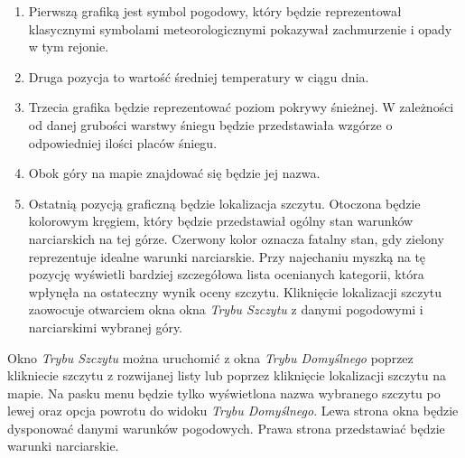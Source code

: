 \documentclass[10pt, a4paper]{article}
\begin{document}
	\begin{enumerate}
\item Pierwszą grafiką jest symbol pogodowy, który będzie reprezentował klasycznymi symbolami meteorologicznymi pokazywał zachmurzenie i opady w tym rejonie. \\
\item Druga pozycja to wartość średniej temperatury w ciągu dnia. \\
\item Trzecia grafika będzie reprezentować poziom pokrywy śnieżnej. W zależności od danej grubości warstwy śniegu będzie przedstawiała wzgórze o odpowiedniej ilości placów śniegu. \\
\item Obok góry na mapie znajdować się będzie jej nazwa. \\
\item Ostatnią pozycją graficzną będzie lokalizacja szczytu. Otoczona będzie kolorowym kręgiem, który będzie przedstawiał ogólny stan warunków narciarskich na tej górze. Czerwony kolor oznacza fatalny stan, gdy zielony reprezentuje idealne warunki narciarskie. Przy najechaniu myszką na tę pozycję wyświetli bardziej szczegółowa lista ocenianych kategorii, która wpłynęła na ostateczny wynik oceny szczytu. Kliknięcie lokalizacji szczytu zaowocuje otwarciem okna okna \textit{Trybu Szczytu} z danymi pogodowymi i narciarskimi wybranej góry.\\
\end{enumerate}
\begin{flushleft}
	Okno \textit{Trybu Szczytu} można uruchomić z okna \textit{Trybu Domyślnego} poprzez klikniecie szczytu z rozwijanej listy lub poprzez kliknięcie lokalizacji szczytu na mapie. Na pasku menu będzie tylko wyświetlona nazwa wybranego szczytu po lewej oraz opcja powrotu do widoku \textit{Trybu Domyślnego}. 
	Lewa strona okna będzie dysponować danymi warunków pogodowych. Prawa strona przedstawiać będzie warunki narciarskie.\\
		\end{flushleft}
\end{document}
